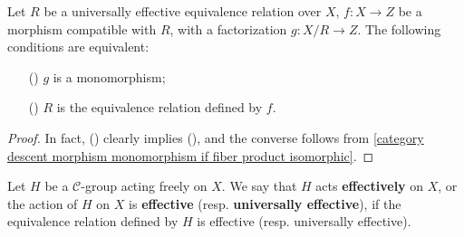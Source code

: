 \begin{proposition}\label{category universal effective equivalence factor monomorphism iff}
Let $R$ be a universally effective equivalence relation over $X$, $f:X\to Z$ be a morphism compatible with $R$, with a factorization $g:X/R\to Z$. The following conditions are equivalent:
\begin{enumerate}
    \item[(\rmnum{1})] $g$ is a monomorphism;
    \item[(\rmnum{2})] $R$ is the equivalence relation defined by $f$. 
\end{enumerate}
\end{proposition}
\begin{proof}
In fact, () clearly implies (), and the converse follows from \cref{category descent morphism monomorphism if fiber product isomorphic}. 
\end{proof}

\begin{definition}
Let $H$ be a $\mathcal{C}$-group acting freely on $X$. We say that $H$ acts \textbf{effectively} on $X$, or the action of $H$ on $X$ is \textbf{effective} (resp. \textbf{universally effective}), if the equivalence relation defined by $H$ is effective (resp. universally effective).
\end{definition}

